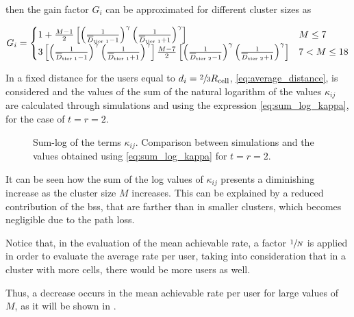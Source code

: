 \noindent
then the gain factor $G_i$ can be approximated for different cluster sizes as

\begin{equation} \label{eq:cluster_gain_value}
    G_i = \begin{cases}
    1 + \frac{M - 1}{2}\left[ \left( \frac{1}{\overline{D}_{\text{tier 1}} - 1}\right)^{\gamma}
    \left( \frac{1}{\overline{D}_{\text{tier 1}} + 1}\right)^{\gamma} \right]
    & M \leq 7 \\
    3 \left[ \left( \frac{1}{\overline{D}_{\text{tier 1}} - 1}\right)^{\gamma}
    \left( \frac{1}{\overline{D}_{\text{tier 1}} + 1}\right)^{\gamma} \right]
    \frac{M - 7}{2} \left[ \left( \frac{1}{\overline{D}_{\text{tier 2}} - 1}\right)^{\gamma}
    \left( \frac{1}{\overline{D}_{\text{tier 2}} + 1}\right)^{\gamma} \right]
    & 7 < M \leq 18
    \end{cases}
\end{equation}

In  a fixed distance for the users equal to $d_{i} =
\sfrac{2}{3}R_{\text{cell}}$, \eqref{eq:average_distance}, is considered and the values
of the sum of the natural logarithm of the values $\kappa_{ij}$ are calculated
through simulations and using the expression \eqref{eq:sum_log_kappa}, for the
case of $t = r = 2$.

\begin{figure}[t]
    
    \restoregeometry
\caption{Sum-log of the terms $\kappa_{ij}$. Comparison between simulations and
the values obtained using \eqref{eq:sum_log_kappa} for $ t = r = 2$.}
\label{fig:sum_log_kappa}
\end{figure}

It can be seen how the sum of the log values of $\kappa_{ij}$ presents a
diminishing increase as the cluster size $M$ increases. This can be explained by
a reduced contribution of the \glspl{bs}, that are farther than in smaller
clusters, which becomes negligible due to the path loss.

Notice that, in the evaluation of the mean achievable rate, a factor
$\sfrac{1}{N}$ is applied in order to evaluate the average rate per user, taking
into consideration that in a cluster with more cells, there would be more users
as well.

Thus, a decrease occurs in the mean achievable rate per user for large values of
$M$, as it will be shown in .


